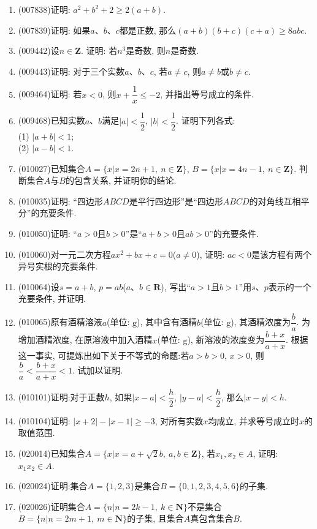 \documentclass[10pt,a4paper]{article}
\begin{document}
\begin{enumerate}[1.]
\item {\tiny (007838)}证明: $a^2+b^2+2\ge 2(a+b)$.
\item {\tiny (007839)}证明: 如果$a$、$b$、$c$都是正数, 那么$(a+b)(b+c)(c+a)\ge 8abc$.
\item {\tiny (009442)}设$n\in \mathbf{Z}$. 证明: 若$n^3$是奇数, 则$n$是奇数.
\item {\tiny (009443)}证明: 对于三个实数$a$、$b$、$c$, 若$a\ne c$, 则$a\ne b$或$b\ne c$.
\item {\tiny (009464)}证明: 若$x<0$, 则$x+\dfrac 1x\le -2$, 并指出等号成立的条件.
\item {\tiny (009468)}已知实数$a$、$b$满足$|a| <\dfrac 12$, $|b| <\dfrac 12$. 证明下列各式:\\
(1) $|a+b| <1$;\\
(2) $|a-b| <1$.
\item {\tiny (010027)}已知集合$A=\{x|x=2n+1,\ n\in \mathbf{Z}\}$, $B=\{x|x=4n-1,\ n\in \mathbf{Z}\}$. 判断集合$A$与$B$的包含关系, 并证明你的结论.
\n\vspace*{16ex}
\item {\tiny (010035)}证明: ``四边形$ABCD$是平行四边形''是``四边形$ABCD$的对角线互相平分''的充要条件.
\item {\tiny (010050)}证明: ``$a>0$且$b>0$''是``$a+b>0$且$ab>0$''的充要条件.
\item {\tiny (010060)}对一元二次方程$ax^2+bx+c=0$($a\ne 0$), 证明: $ac<0$是该方程有两个异号实根的充要条件.
\item {\tiny (010064)}设$s=a+b$, $p=ab$($a$、$b\in\mathbf{R}$), 写出``$a>1$且$b>1$''用$s$、$p$表示的一个充要条件, 并证明.
\item {\tiny (010065)}原有酒精溶液$a$(单位: $\text{g}$), 其中含有酒精$b$(单位: $\text{g}$), 其酒精浓度为$\dfrac ba$. 为增加酒精浓度, 在原溶液中加入酒精$x$(单位: $\text{g}$), 新溶液的浓度变为$\dfrac{b+x}{a+x}$. 根据这一事实, 可提炼出如下关于不等式的命题:若$a>b>0$, $x>0$, 则$\dfrac ba<\dfrac{b+x}{a+x}<1$. 试加以证明.
\item {\tiny (010101)}证明:对于正数$h$, 如果$|x-a| <\dfrac h2$, $|y-a| <\dfrac h2$, 那么$|x-y| <h$.
\item {\tiny (010104)}证明: $|x+2|-|x-1|\ge -3$, 对所有实数$x$均成立, 并求等号成立时$x$的取值范围.
\item {\tiny (020014)}已知集合$A=\{x|x=a+\sqrt 2b,\ a,b\in \mathbf{Z}\}$, 若$x_1,x_2\in A$, 证明: $x_1x_2\in A$.
\item {\tiny (020024)}证明:集合$A=\{1,2,3\}$是集合$B=\{0,1,2,3,4,5,6\}$的子集.
\item {\tiny (020026)}证明集合$A=\{n|n=2k-1,\ k\in \mathbf{N}\}$不是集合$B=\{n|n=2m+1, \ m\in \mathbf{N}\}$的子集, 且集合$A$真包含集合$B$.

\end{enumerate}
\end{document}
